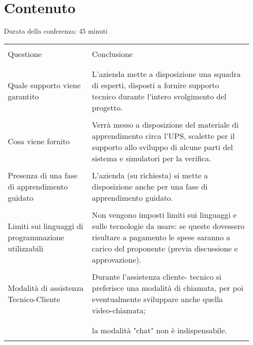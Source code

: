 \section{Contenuto}
Durata della conferenza: 45 minuti
\newline
\begin{longtable}{|p{7cm}|p{8cm}|}
    \hline
    & \\
    Questione & Conclusione\\
    & \\
    \hline
    & \\

    Quale supporto viene garantito    
    &
    L'azienda mette a disposizione
    una squadra di esperti,
    disposti a fornire supporto
    tecnico durante l'intero
    svolgimento del progetto.\\

    & \\

    Cosa viene fornito
    &
    Verrà messo a disposizione del
    materiale di apprendimento
    circa l'UPS, scalette per il
    supporto allo sviluppo di
    alcune parti del sistema e
    simulatori per la verifica.\\

    & \\

    Presenza di una fase di apprendimento guidato  
    &
    L'azienda (su richiesta) si
    mette a disposizione anche
    per una fase di apprendimento
    guidato.\\

    & \\

    Limiti sui linguaggi di programmazione utilizzabili     
    &
    Non vengono imposti limiti sui
    linguaggi e sulle tecnologie da
    usare: se queste dovessero
    risultare a pagamento le spese
    saranno a carico del proponente
    (previa discussione e approvazione).\\

    & \\

    Modalità di assistenza Tecnico-Cliente  
    &
    Durante l'assistenza cliente-
    tecnico si preferisce una
    modalità di chiamata, per poi
    eventualmente sviluppare
    anche quella video-chiamata;\\
    & \\
    \hline
    & \\
    &
    la modalità "chat" non è
    indispensabile.\\
    & \\


\end{longtable}
